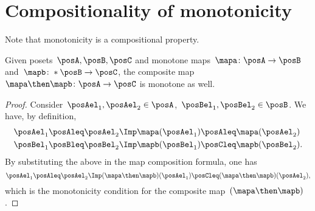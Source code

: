 \section{Compositionality of monotonicity}
Note that monotonicity is a compositional property.
\begin{lemma}
  Given posets~$\posA,\posB,\posC$ and monotone maps~$\mapa\colon \posA \to \posB$ and~$\mapb\colon* \posB \to \posC$, the composite map~$\mapa\then \mapb\colon  \posA \to \posC$ is
  monotone as well.
\end{lemma}
\begin{proof}
  Consider~$\posAel_1,\posAel_2 \in \posA$,~$\posBel_1,\posBel_2\in \posB$. We have, by definition,
  \begin{equation}
    \begin{aligned}
      \posAel_1\posAleq \posAel_2 &\Imp \mapa(\posAel_1)\posAleq \mapa(\posAel_2)\\
      \posBel_1\posBleq \posBel_2 &\Imp \mapb(\posBel_1)\posCleq \mapb(\posBel_2).
    \end{aligned}
  \end{equation}
  By substituting the above in the map composition formula, one has
  \begin{equation}
    \posAel_1\posAleq \posAel_2 \Imp (\mapa\then \mapb)(\posAel_1) \posCleq (\mapa\then \mapb)(\posAel_2),
  \end{equation}
  which is the monotonicity condition for the composite map~$(\mapa\then \mapb)$.
\end{proof}